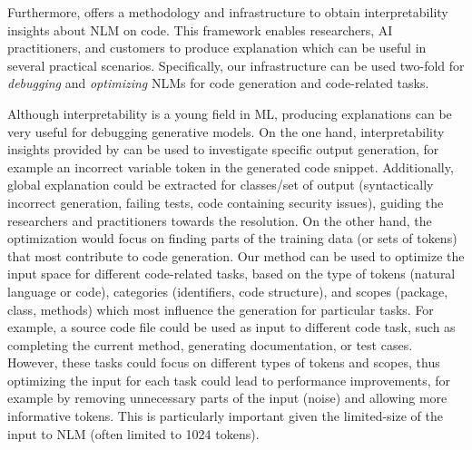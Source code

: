 Furthermore, \codeSeqRational offers a methodology and infrastructure to obtain interpretability insights about NLM on code. This framework enables researchers, AI practitioners, and customers to produce explanation which can be useful in several practical scenarios. Specifically, our infrastructure can be used two-fold for \textit{debugging} and \textit{optimizing} NLMs for code generation and code-related tasks. 

Although interpretability is a young field in ML, producing explanations can be very useful for debugging generative models. On the one hand, interpretability insights provided by \codeSeqRational can be used to investigate specific output generation, for example an incorrect variable token in the generated code snippet. Additionally, global explanation could be extracted for classes/set of output (\eg syntactically incorrect generation, failing tests, code containing security issues), guiding the researchers and practitioners towards the resolution. On the other hand, the optimization would focus on finding parts of the training data (or sets of tokens) that most contribute to code generation. Our method \codeSeqRational can be used to optimize the input space for different code-related tasks, based on the type of tokens (\ie natural language or code), categories (\ie identifiers, code structure), and scopes (\ie package, class, methods) which most influence the generation for particular tasks. For example, a source code file could be used as input to different code task, such as completing the current method, generating documentation, or test cases. However, these tasks could focus on different types of tokens and scopes, thus optimizing the input for each task could lead to performance improvements, for example by removing unnecessary parts of the input (noise) and allowing more informative tokens. This is particularly important given the limited-size of the input to NLM (often limited to 1024 tokens).








